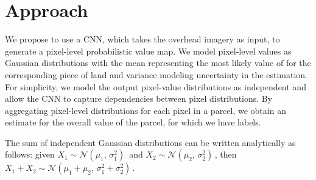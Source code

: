 \documentclass[10pt,twocolumn,a4paper]{article}
\begin{document}





\section{Approach}

We propose to use a CNN, which takes the overhead imagery as input, to generate a pixel-level probabilistic value map. We model pixel-level values as Gaussian distributions with the mean representing the most likely value of for the corresponding piece of land and variance modeling uncertainty in the estimation. For simplicity, we model the output pixel-value distributions as independent and allow the CNN to capture dependencies between pixel distributions. By aggregating pixel-level distributions for each pixel in a parcel, we obtain an estimate for the overall value of the parcel, for which we have labels.



The sum of independent Gaussian distributions can be written analytically as follows: given $X_1 \sim \mathcal{N}(\mu_1,\,\sigma^{2}_1)\,$ and $X_2 \sim \mathcal{N}(\mu_2,\,\sigma^{2}_2)\,$, then $X_1+X_2 \sim \mathcal{N}(\mu_1+\mu_2,\,\sigma^{2}_1+\sigma^{2}_2)\,$. 
\end{document}
